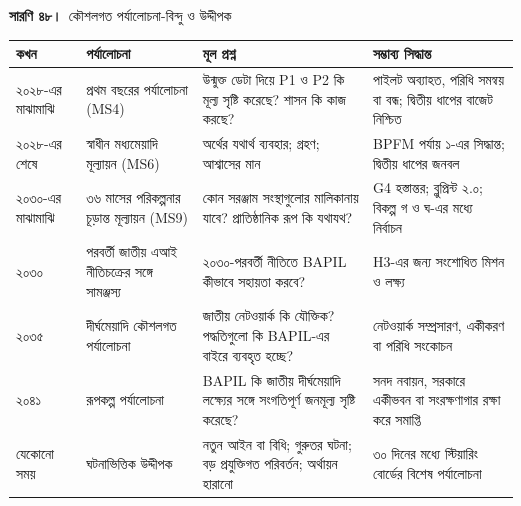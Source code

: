 \documentclass[border=10pt]{standalone}
\begin{document}
\begin{minipage}{17cm}
{\large\bfseries সারণি ৪৮।}\ {\large কৌশলগত পর্যালোচনা-বিন্দু ও উদ্দীপক}\par\vspace{7pt}
\small
{}
\begin{tabularx}{\linewidth}{@{}>{\hsize=0.494\hsize\raggedright\arraybackslash}X>{\hsize=0.899\hsize\raggedright\arraybackslash}X>{\hsize=1.348\hsize\raggedright\arraybackslash}X>{\hsize=1.258\hsize\raggedright\arraybackslash}X@{}}
\arrayrulecolor{bapilrule}\toprule
\rowcolor{white}\textbf{কখন} & \textbf{পর্যালোচনা} & \textbf{মূল প্রশ্ন} & \textbf{সম্ভাব্য সিদ্ধান্ত} \\
\midrule
২০২৮-এর মাঝামাঝি & প্রথম বছরের পর্যালোচনা (MS4) & উন্মুক্ত ডেটা দিয়ে P1 ও P2 কি মূল্য সৃষ্টি করেছে? শাসন কি কাজ করছে? & পাইলট অব্যাহত, পরিধি সমন্বয় বা বন্ধ; দ্বিতীয় ধাপের বাজেট নিশ্চিত \\
২০২৮-এর শেষে & স্বাধীন মধ্যমেয়াদি মূল্যায়ন (MS6) & অর্থের যথার্থ ব্যবহার; গ্রহণ; আশ্বাসের মান & BPFM পর্যায় ১-এর সিদ্ধান্ত; দ্বিতীয় ধাপের জনবল \\
২০৩০-এর মাঝামাঝি & ৩৬ মাসের পরিকল্পনার চূড়ান্ত মূল্যায়ন (MS9) & কোন সরঞ্জাম সংস্থাগুলোর মালিকানায় যাবে? প্রাতিষ্ঠানিক রূপ কি যথাযথ? & G4 হস্তান্তর; ব্লুপ্রিন্ট ২.০; বিকল্প গ ও ঘ-এর মধ্যে নির্বাচন \\
২০৩০ & পরবর্তী জাতীয় এআই নীতিচক্রের সঙ্গে সামঞ্জস্য & ২০৩০-পরবর্তী নীতিতে BAPIL কীভাবে সহায়তা করবে? & H3-এর জন্য সংশোধিত মিশন ও লক্ষ্য \\
২০৩৫ & দীর্ঘমেয়াদি কৌশলগত পর্যালোচনা & জাতীয় নেটওয়ার্ক কি যৌক্তিক? পদ্ধতিগুলো কি BAPIL-এর বাইরে ব্যবহৃত হচ্ছে? & নেটওয়ার্ক সম্প্রসারণ, একীকরণ বা পরিধি সংকোচন \\
২০৪১ & রূপকল্প পর্যালোচনা & BAPIL কি জাতীয় দীর্ঘমেয়াদি লক্ষ্যের সঙ্গে সংগতিপূর্ণ জনমূল্য সৃষ্টি করেছে? & সনদ নবায়ন, সরকারে একীভবন বা সংরক্ষণাগার রক্ষা করে সমাপ্তি \\
যেকোনো সময় & ঘটনাভিত্তিক উদ্দীপক & নতুন আইন বা বিধি; গুরুতর ঘটনা; বড় প্রযুক্তিগত পরিবর্তন; অর্থায়ন হারানো & ৩০ দিনের মধ্যে স্টিয়ারিং বোর্ডের বিশেষ পর্যালোচনা \\
\bottomrule
\end{tabularx}
\par\vspace{5pt}{\footnotesize\itshape ক্যালেন্ডারের তারিখগুলো ২০২৭-এর প্রথমার্ধে ধাপ ০ এবং মাস ১ জুলাই ২০২৭ ধরে নির্ধারিত; পরিকল্পনা দেরিতে শুরু হলে প্রথম তিনটি পর্যালোচনাও সেই অনুযায়ী পিছিয়ে যাবে (সংযুক্তি ন)।}
\par{}
\end{minipage}
\end{document}
